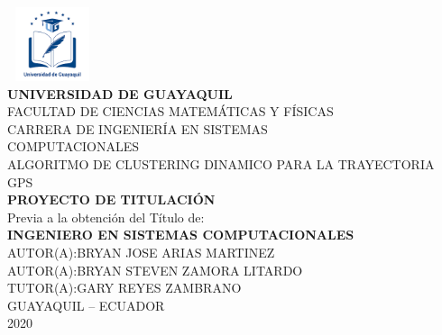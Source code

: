 \documentclass[12pt, a4paper, nofontenc, numbers=endperiod]{apa7}
\begin{document}
	
	\thispagestyle{empty}
	{ %
		\begin{center}		
			\includegraphics[width=2.65cm,height=2.17cm]{Imagenes/Figura1}	\\
			\textbf{\Large UNIVERSIDAD DE GUAYAQUIL} \\ [0.5cm]
			{\large FACULTAD DE CIENCIAS MATEMÁTICAS Y FÍSICAS}\\
			{\large CARRERA DE INGENIERÍA EN SISTEMAS \\  COMPUTACIONALES } \\ [0.5cm]
			{\large ALGORITMO DE CLUSTERING DINAMICO PARA LA TRAYECTORIA GPS\\
			{\textbf{\large PROYECTO DE TITULACIÓN}} \\ [0.5cm]
			{\large Previa a la obtención del Título de:} \\ [0.5cm]
			{\textbf{\large  INGENIERO EN SISTEMAS COMPUTACIONALES}} \\ [0.5cm]
			{\large  AUTOR(A):BRYAN JOSE ARIAS MARTINEZ} \\ [0.5cm]
			{\large  AUTOR(A):BRYAN STEVEN ZAMORA LITARDO} \\ [0.5cm]
			{\large  TUTOR(A):GARY REYES ZAMBRANO} \\ [0.5cm]
			{\large  GUAYAQUIL – ECUADOR}\\
				2020
			}
		\end{center}
	}
	\newpage
	\thispagestyle{empty}
\end{document}
